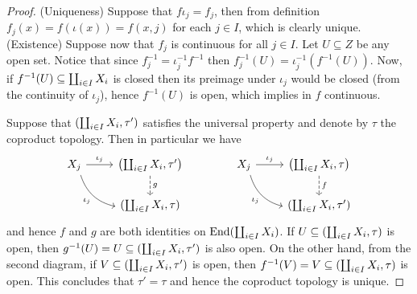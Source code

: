 \begin{proof}
    (Uniqueness) Suppose that \(f  \iota_j = f_j\), then from definition
    \(f_j(x) = f(\iota(x)) = f(x, j)\) for each \(j \in I\), which is clearly
    unique.
    (Existence) Suppose now that \(f_j\) is continuous for all \(j \in I\). Let
    \(U \subseteq Z\) be any open set. Notice that since \(f_j^{-1} = \iota_j^{-1}
    f^{-1}\) then \(f_j^{-1}(U) = \iota_j^{-1}(f^{-1}(U))\). Now, if
    \(f^{-1}(U) \subseteq \coprod_{i \in I} X_i\) is closed then its preimage
    under \(\iota_j\) would be closed (from the continuity of \(\iota_j\)), hence
    \(f^{-1}(U)\) is open, which implies in \(f\) continuous.

    Suppose that \((\coprod_{i \in I} X_i, \tau')\) satisfies the universal
    property and denote by \(\tau\) the coproduct topology. Then in
    particular we have
    \[
        \begin{tikzcd}
            X_j \ar[r, "\iota_j"] \ar[rd, bend right, swap, "\iota_j"]
            &\left( \bigatt_{i \in I} X_i, \tau' \right)
            \ar[d, dashed, "g"] \\
            &(\bigatt_{i \in I} X_i, \tau)
        \end{tikzcd}
        \qquad \qquad
        \begin{tikzcd}
            X_j \ar[r, "\iota_j"] \ar[rd, bend right, swap, "\iota_j"]
            &\left( \bigatt_{i \in I} X_i, \tau \right)
            \ar[d, dashed, "f"] \\
            &(\bigatt_{i \in I} X_i, \tau')
        \end{tikzcd}
    \]
    and hence \(f\) and \(g\) are both identities on
    \(\operatorname{End}(\coprod_{i \in I} X_i)\). If
    \(U \subseteq (\coprod_{i \in I} X_i, \tau)\) is open, then
    \(g^{-1}(U) = U \subseteq (\coprod_{i \in I} X_i, \tau')\) is also open. On
    the other hand, from the second diagram, if
    \(V \subseteq (\coprod_{i \in I} X_i, \tau')\) is open, then
    \(f^{-1}(V) = V \subseteq (\coprod_{i \in I} X_i, \tau)\) is open. This
    concludes that \(\tau' = \tau\) and hence the coproduct topology is unique.
\end{proof}

